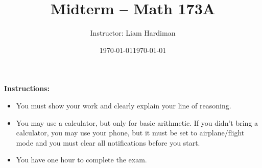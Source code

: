 \documentclass[11pt]{article}
\date{\today}
\title{Midterm -- Math 173A}
\author{Instructor: Liam Hardiman}
\date{\today}
\theoremstyle{plain}
\begin{document}
\maketitle


{\bf Instructions: } \begin{itemize} 
\item You must show your work and clearly
explain your line of reasoning.
\item You may use a calculator, but only for basic arithmetic. If you didn't bring a calculator, you may use your phone, but it must be set to airplane/flight mode and you must clear all notifications before you start.
\item You have one hour to complete the exam.
\end{itemize}

\medskip
\medskip


\newpage
\end{document}
